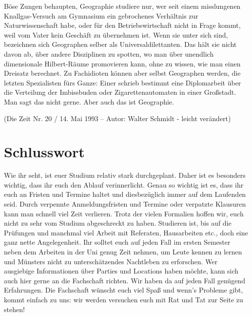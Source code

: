 Böse Zungen behaupten, Geographie studiere nur, wer seit einem misslungenen Knallgas-Versuch am Gymnasium ein gebrochenes Verhältnis zur Naturwissenschaft habe, oder für den Betriebswirtschaft nicht in Frage kommt, weil vom Vater kein Geschäft zu übernehmen ist. Wenn sie unter sich sind, bezeichnen sich Geographen selber als Universaldilettanten. Das hält sie nicht davon ab, über andere Disziplinen zu spotten, wo man über unendlich dimensionale Hilbert-Räume promovieren kann, ohne zu wissen, wie man einen Dreisatz berechnet. Zu Fachidioten können aber selbst Geographen werden, die letzten Spezialisten fürs Ganze: Einer schrieb bestimmt eine Diplomarbeit über die Verteilung der Imbissbuden oder Zigarettenautomaten in einer Großstadt. Man sagt das nicht gerne. Aber auch das ist Geographie. 

(Die Zeit Nr. 20 / 14. Mai 1993 – Autor: Walter Schmidt - leicht verändert)

\section*{Schlusswort}
Wie ihr seht, ist euer Studium relativ stark durchgeplant. Daher ist es besonders wichtig, dass ihr euch den Ablauf verinnerlicht. Genau so wichtig ist es, dass ihr euch an Fristen und Termine haltet und diesbezüglich immer auf dem Laufenden seid. Durch verpennte Anmeldungsfristen und Termine oder verpatzte Klausuren kann man schnell viel Zeit verlieren. Trotz der vielen Formalien hoffen wir, euch nicht zu sehr vom Studium abgeschreckt zu haben. Studieren ist, bis auf die Prüfungen und manchmal viel Arbeit mit Referaten, Hausarbeiten etc., doch eine ganz nette Angelegenheit. Ihr solltet euch auf jeden Fall im ersten Semester neben dem Arbeiten in der Uni genug Zeit nehmen, um Leute kennen zu lernen und Münsters nicht zu unterschätzendes Nachtleben zu erforschen. Wer ausgiebige Informationen über Parties und Locations haben möchte, kann sich auch hier gerne an die Fachschaft richten. Wir haben da auf jeden Fall genügend Erfahrungen. 
Die Fachschaft wünscht euch viel Spaß und wenn’s Probleme gibt, kommt einfach zu uns: wir werden versuchen euch mit Rat und Tat zur Seite zu stehen!
